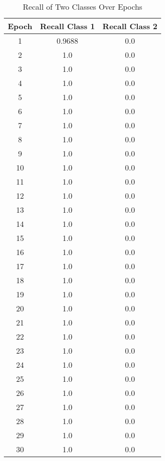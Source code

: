 \begin{table}[H]
\centering
\begin{tabular}{c|c|c}
\hline
Epoch & Recall Class 1 & Recall Class 2 \\
\hline
1 & 0.9688 & 0.0 \\
2 & 1.0 & 0.0 \\
3 & 1.0 & 0.0 \\
4 & 1.0 & 0.0 \\
5 & 1.0 & 0.0 \\
6 & 1.0 & 0.0 \\
7 & 1.0 & 0.0 \\
8 & 1.0 & 0.0 \\
9 & 1.0 & 0.0 \\
10 & 1.0 & 0.0 \\
11 & 1.0 & 0.0 \\
12 & 1.0 & 0.0 \\
13 & 1.0 & 0.0 \\
14 & 1.0 & 0.0 \\
15 & 1.0 & 0.0 \\
16 & 1.0 & 0.0 \\
17 & 1.0 & 0.0 \\
18 & 1.0 & 0.0 \\
19 & 1.0 & 0.0 \\
20 & 1.0 & 0.0 \\
21 & 1.0 & 0.0 \\
22 & 1.0 & 0.0 \\
23 & 1.0 & 0.0 \\
24 & 1.0 & 0.0 \\
25 & 1.0 & 0.0 \\
26 & 1.0 & 0.0 \\
27 & 1.0 & 0.0 \\
28 & 1.0 & 0.0 \\
29 & 1.0 & 0.0 \\
30 & 1.0 & 0.0 \\
\hline
\end{tabular}
\caption{Recall of Two Classes Over Epochs}
\end{table}
